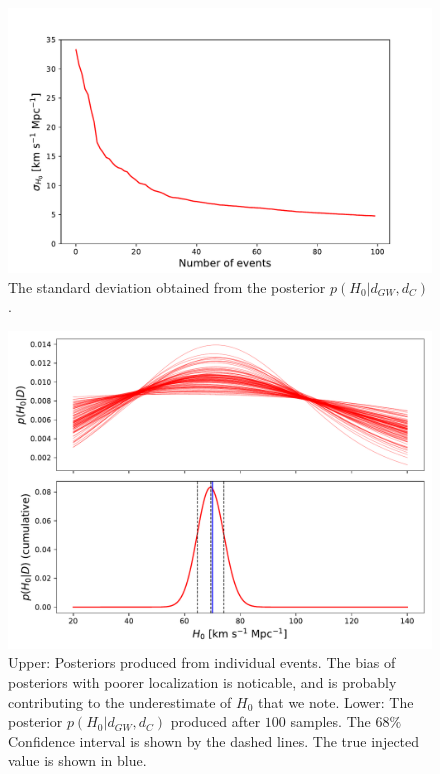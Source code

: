 \begin{figure}
    \centering
    \includegraphics[width=0.95\columnwidth]{figures/std.pdf}
    \caption{The standard deviation obtained from the posterior $p(H_0 | d_{GW}, d_C)$.}
    \label{fig:std}
\end{figure}

\begin{figure}
    \centering
    \includegraphics[width=0.95\columnwidth]{figures/posterior.pdf}
    \caption{Upper: Posteriors produced from individual events. The bias of posteriors with poorer localization is noticable, and is probably contributing to the underestimate of $H_0$ that we note. Lower: The posterior $p(H_0 | d_{GW}, d_C)$ produced after $100$ samples. The $68\%$ Confidence interval is shown by the dashed lines. The true injected value is shown in blue.}
    \label{fig:posterior}
\end{figure}

